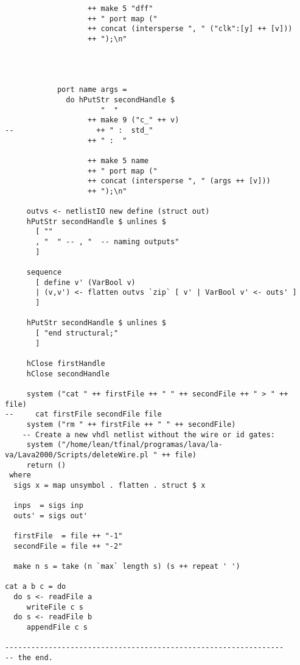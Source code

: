 \begin{lstlisting}
                   ++ make 5 "dff"
                   ++ " port map ("
                   ++ concat (intersperse ", " ("clk":[y] ++ [v]))
                   ++ ");\n"   


            

            port name args =
              do hPutStr secondHandle $
                      "  "
                   ++ make 9 ("c_" ++ v)
--                   ++ " :  std_"
                   ++ " :  "

                   ++ make 5 name
                   ++ " port map ("
                   ++ concat (intersperse ", " (args ++ [v]))
                   ++ ");\n"    

     outvs <- netlistIO new define (struct out)
     hPutStr secondHandle $ unlines $
       [ ""
       , "  " -- , "  -- naming outputs"
       ]
     
     sequence
       [ define v' (VarBool v)
       | (v,v') <- flatten outvs `zip` [ v' | VarBool v' <- outs' ]
       ]
     
     hPutStr secondHandle $ unlines $
       [ "end structural;"
       ]
     
     hClose firstHandle
     hClose secondHandle
     
     system ("cat " ++ firstFile ++ " " ++ secondFile ++ " > " ++ file)
--     cat firstFile secondFile file
     system ("rm " ++ firstFile ++ " " ++ secondFile)
    -- Create a new vhdl netlist without the wire or id gates: 
     system ("/home/lean/tfinal/programas/lava/la-va/Lava2000/Scripts/deleteWire.pl " ++ file)
     return ()
 where
  sigs x = map unsymbol . flatten . struct $ x
  
  inps  = sigs inp
  outs' = sigs out'
 
  firstFile  = file ++ "-1"
  secondFile = file ++ "-2"

  make n s = take (n `max` length s) (s ++ repeat ' ')

cat a b c = do
  do s <- readFile a
     writeFile c s
  do s <- readFile b
     appendFile c s

----------------------------------------------------------------
-- the end.

\end{lstlisting}

